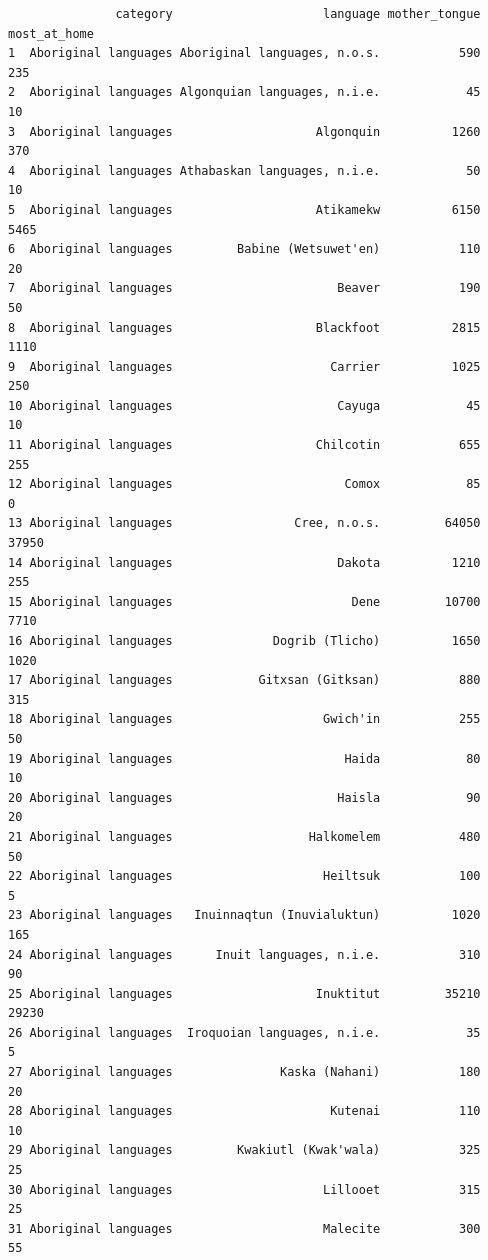 \documentclass[
  letterpaper,
  DIV=11,
  numbers=noendperiod]{scrartcl}
\begin{document}
\begin{verbatim}
               category                     language mother_tongue most_at_home
1  Aboriginal languages Aboriginal languages, n.o.s.           590          235
2  Aboriginal languages Algonquian languages, n.i.e.            45           10
3  Aboriginal languages                    Algonquin          1260          370
4  Aboriginal languages Athabaskan languages, n.i.e.            50           10
5  Aboriginal languages                    Atikamekw          6150         5465
6  Aboriginal languages         Babine (Wetsuwet'en)           110           20
7  Aboriginal languages                       Beaver           190           50
8  Aboriginal languages                    Blackfoot          2815         1110
9  Aboriginal languages                      Carrier          1025          250
10 Aboriginal languages                       Cayuga            45           10
11 Aboriginal languages                    Chilcotin           655          255
12 Aboriginal languages                        Comox            85            0
13 Aboriginal languages                 Cree, n.o.s.         64050        37950
14 Aboriginal languages                       Dakota          1210          255
15 Aboriginal languages                         Dene         10700         7710
16 Aboriginal languages              Dogrib (Tlicho)          1650         1020
17 Aboriginal languages            Gitxsan (Gitksan)           880          315
18 Aboriginal languages                     Gwich'in           255           50
19 Aboriginal languages                        Haida            80           10
20 Aboriginal languages                       Haisla            90           20
21 Aboriginal languages                   Halkomelem           480           50
22 Aboriginal languages                     Heiltsuk           100            5
23 Aboriginal languages   Inuinnaqtun (Inuvialuktun)          1020          165
24 Aboriginal languages      Inuit languages, n.i.e.           310           90
25 Aboriginal languages                    Inuktitut         35210        29230
26 Aboriginal languages  Iroquoian languages, n.i.e.            35            5
27 Aboriginal languages               Kaska (Nahani)           180           20
28 Aboriginal languages                      Kutenai           110           10
29 Aboriginal languages         Kwakiutl (Kwak'wala)           325           25
30 Aboriginal languages                     Lillooet           315           25
31 Aboriginal languages                     Malecite           300           55

\end{verbatim}
\end{document}
